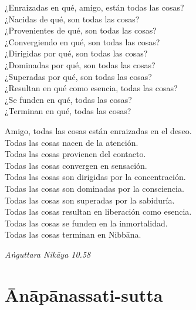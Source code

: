 \clearpage

\begin{english}
  ¿Enraizadas en qué, amigo, están todas las cosas?\\
  ¿Nacidas de qué, son todas las cosas?\\
  ¿Provenientes de qué, son todas las cosas?\\
  ¿Convergiendo en qué, son todas las cosas?\\
  ¿Dirigidas por qué, son todas las cosas?\\
  ¿Dominadas por qué, son todas las cosas?\\
  ¿Superadas por qué, son todas las cosas?\\
  ¿Resultan en qué como esencia, todas las cosas?\\
  ¿Se funden en qué, todas las cosas?\\
  ¿Terminan en qué, todas las cosas?

  \bigskip

  Amigo, todas las cosas están enraizadas en el deseo.\\
  Todas las cosas nacen de la atención.\\
  Todas las cosas provienen del contacto.\\
  Todas las cosas convergen en sensación.\\
  Todas las cosas son dirigidas por la concentración.\\
  Todas las cosas son dominadas por la consciencia.\\
  Todas las cosas son superadas por la sabiduría.\\
  Todas las cosas resultan en liberación como esencia.\\
  Todas las cosas se funden en la inmortalidad.\\
  Todas las cosas terminan en Nibbāna.

\end{english}

{\raggedleft
  \emph{Aṅguttara Nikāya 10.58}
\par}

\chapter{Ānāpānassati-sutta}


\begin{leader}
\end{leader}

